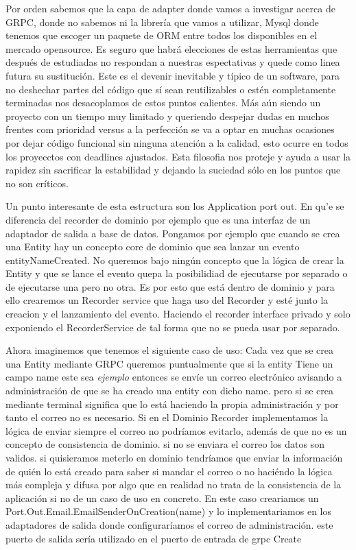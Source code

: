 Por orden sabemos que la capa de adapter donde vamos a investigar acerca de GRPC, donde no sabemos ni la librería que vamos a utilizar, Mysql donde tenemos que escoger un paquete de ORM entre todos los disponibles en el mercado opensource. Es seguro que habrá elecciones de estas herramientas que después de estudiadas no respondan a nuestras espectativas y quede como linea futura su sustitución. Este es el devenir inevitable y típico de un software, para no deshechar partes del código que sí sean reutilizables o estén completamente terminadas nos desacoplamos de estos puntos calientes. Más aún siendo un proyecto con un tiempo muy limitado y queriendo despejar dudas en muchos frentes com prioridad versus a la perfección se va a optar en muchas ocasiones por dejar código funcional sin ninguna atención a la calidad, esto ocurre en todos los proyecctos con deadlines ajustados. Esta filosofia nos proteje y ayuda a usar la rapidez sin sacrificar la estabilidad y dejando la suciedad sólo en los puntos que no son críticos.

Un punto interesante de esta estructura son los Application port out. En qu'e se diferencia del recorder de dominio por ejemplo que es una interfaz de un adaptador de salida a base de datos. Pongamos por ejemplo que cuando se crea una Entity hay un concepto core de dominio que sea lanzar un evento entityNameCreated. No queremos bajo ningún concepto que la lógica de crear la Entity y que se lance el evento quepa la posibilidiad de ejecutarse por separado o de ejecutarse una pero no otra. Es por esto que está dentro de dominio y para ello crearemos un Recorder service que haga uso del Recorder y esté junto la creacion y el lanzamiento del evento. Haciendo el recorder interface privado y solo exponiendo el RecorderService de tal forma que no se pueda usar por separado.

Ahora imaginemos que tenemos el siguiente caso de uso:
Cada vez que se crea una Entity mediante GRPC queremos puntualmente que si la entity Tiene un campo name este sea \textit{ejemplo} entonces se envíe un correo electrónico avisando a administración de que se ha creado una entity con dicho name.
pero si se crea mediante terminal significa que lo está haciendo la propia administración y por tanto el correo no es necesario. Si en el Dominio Recorder implementamos la lógica de enviar siempre el correo no podríamos evitarlo, además de que no es un concepto de consistencia de dominio. si no se enviara el correo los datos son validos. si quisieramos meterlo en dominio tendríamos que enviar la información de quién lo está creado para saber si mandar el correo o no haciéndo la lógica más compleja y difusa por algo que en realidad no trata de la consistencia de la aplicación si no de un caso de uso en concreto. En este caso creariamos un Port.Out.Email.EmailSenderOnCreation(name) y lo implementariamos en los adaptadores de salida donde configuraríamos el correo de administración. este puerto de salida sería utilizado en el puerto de entrada de grpc Create


